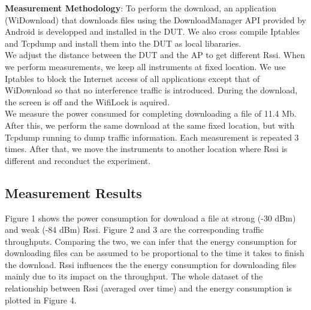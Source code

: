 \documentclass[journal]{IEEEtran}
\begin{document}
{\bf Measurement Methodology}: To perform the download, an application (WiDownload) that downloads files 
using the DownloadManager API provided by Android is developped and installed in the DUT. 
We also cross compile Iptables and Tcpdump and install them into the DUT as local libararies.
\\  
\indent
We adjust the distance between the DUT and the AP to get different Rssi. 
When we perform measurements, we keep all instruments at fixed location. 
We use Iptables to block the Internet access of all applications 
except that of WiDownload so that no interference traffic is introduced. 
During the download, the screen is off and the WifiLock is aquired. 
\\  
\indent We measure the power consumed for 
completing downloading a file of 11.4 Mb. After this, we perform the same download at the same fixed location, but with 
Tcpdump running to dump traffic information. Each measurement is repeated 3 times. After that, we move the instruments to 
another location where Rssi is different and reconduct the experiment. 


\subsection{Measurement Results}
Figure 1 shows the power consumption for download a file at strong (-30 dBm) and weak (-84 dBm) Rssi.
Figure 2 and 3 are the corresponding traffic throughputs. Comparing the two, we can infer that the energy consumption 
for downloading files can be assumed to be proportional to the time it takes to finish the download. 
Rssi influences the the energy consumption for downloading files mainly due to its impact on the throughput.
The whole dataset of the relationship between Rssi (averaged over time) and the energy consumption is plotted in Figure 4.
\end{document}
